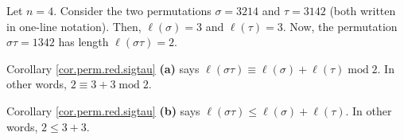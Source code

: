 \begin{example}
Let $n=4$. Consider the two permutations $\sigma=3214$ and $\tau=3142$ (both
written in one-line notation). Then, $\ell\left(  \sigma\right)  =3$ and
$\ell\left(  \tau\right)  =3$. Now, the permutation $\sigma\tau=1342$ has
length $\ell\left(  \sigma\tau\right)  =2$.

Corollary \ref{cor.perm.red.sigtau} \textbf{(a)} says $\ell\left(  \sigma
\tau\right)  \equiv\ell\left(  \sigma\right)  +\ell\left(  \tau\right)
\operatorname{mod}2$. In other words, $2\equiv3+3\operatorname{mod}2$.

Corollary \ref{cor.perm.red.sigtau} \textbf{(b)} says $\ell\left(  \sigma
\tau\right)  \leq\ell\left(  \sigma\right)  +\ell\left(  \tau\right)  $. In
other words, $2\leq3+3$.
\end{example}

